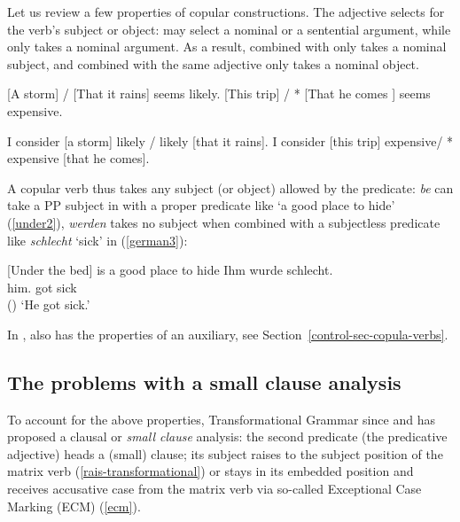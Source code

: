 Let us review a few properties of copular constructions.
The adjective selects for the verb's subject or object:  may select a nominal or a
sentential argument, while  only takes a nominal argument. As a result, 
combined with  only takes a nominal subject, and  combined with the
same adjective only takes a nominal object. 


\begin{exe}
\ex \label{storm}
\begin{xlist}
\ex{} [A storm] / [That it rains] seems likely.
\ex{} [This trip] / * [That he comes ] seems expensive.
\end{xlist}
\ex \begin{xlist}
\ex 	I consider [a storm] likely / likely [that it rains].
\ex 	I consider [this trip] expensive/ * expensive [that he comes].
\end{xlist}	
\end{exe}


A copular verb thus takes any subject (or object) allowed by the predicate: \emph{be} can take a PP
subject in  with a proper predicate like `a good place to hide' (\ref{under2}), \emph{werden} takes no subject when combined with a
subjectless predicate like \emph{schlecht} `sick' in  (\ref{german3}):

\eal
\ex{}[Under the bed] is a good place to hide \label{under2}
\ex
\label{german3} 
\gll Ihm        wurde schlecht.\footnotemark\\
     him.\DAT{} got   sick\\\hfill()
\glt `He got sick.'
\zl

\noindent
In ,  also has the properties of an auxiliary, see Section~\ref{control-sec-copula-verbs}.

\subsection{The problems with a small clause analysis}

To account for the above properties, Transformational Grammar since \citet{Stowell1983}\addpages and
\citet{Chomsky1986}\addpages has proposed a clausal or \emph{small clause} analysis: the second predicate
(the predicative adjective) heads a (small) clause; its subject raises to the subject position of the
matrix verb (\ref{rais-transformational}) or stays in its embedded position and receives accusative case from
the matrix verb via so-called Exceptional Case Marking (ECM) (\ref{ecm}).


